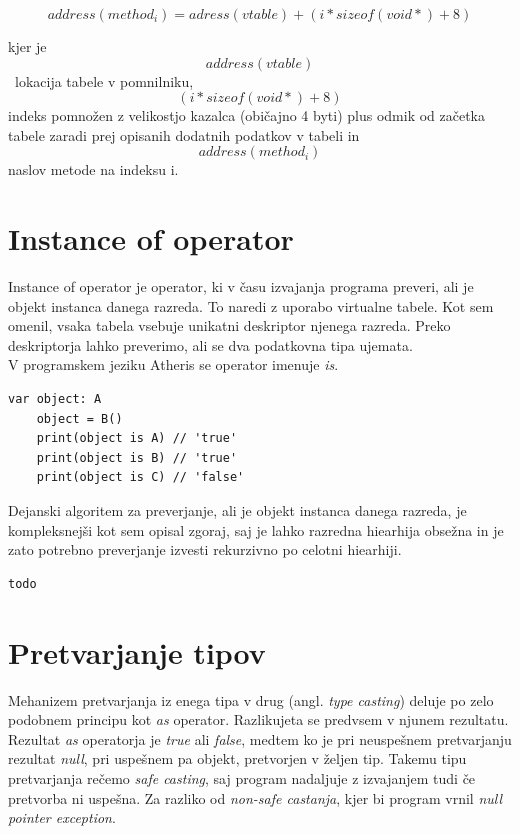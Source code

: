\documentclass[a4paper, 12p]{book}
\begin{document}
\[ address(method_i) = adress(vtable) + (i * sizeof(void*) + 8) \]

kjer je \[address(vtable)\]\ lokacija tabele v pomnilniku, \[(i * sizeof(void*) + 8)\] indeks pomnožen z velikostjo kazalca (običajno 4 byti) plus odmik od začetka tabele zaradi prej opisanih dodatnih podatkov v tabeli in \[ address(method_i)\] naslov metode na indeksu i.

\section{Instance of operator}

Instance of operator je operator, ki v času izvajanja programa preveri, ali je objekt instanca danega razreda. To naredi z uporabo virtualne tabele. Kot sem omenil, vsaka tabela vsebuje unikatni deskriptor njenega razreda. Preko deskriptorja lahko preverimo, ali se dva podatkovna tipa ujemata. \\
\indent V programskem jeziku Atheris se operator imenuje \textit{is}.

\begin{lstlisting}[caption={Uporaba operatorja \textit{is} za razrede iz sheme ~\ref{vtables}}, captionpos=b]
	var object: A
	object = B()
	print(object is A) // 'true'
	print(object is B) // 'true'
	print(object is C) // 'false'
\end{lstlisting}

Dejanski algoritem za preverjanje, ali je objekt instanca danega razreda, je  kompleksnejši kot sem opisal zgoraj, saj je lahko razredna hiearhija obsežna in je zato potrebno preverjanje izvesti rekurzivno po celotni hiearhiji.

\begin{lstlisting}[caption={Algoritem za izračun ali je objekt instanca danega razeda}, captionpos=b]
todo
\end{lstlisting}

\section{Pretvarjanje tipov}

Mehanizem pretvarjanja iz enega tipa v drug (angl. \textit{type casting}) deluje po zelo podobnem principu kot \textit{as} operator. Razlikujeta se predvsem v njunem rezultatu. Rezultat \textit{as} operatorja je \textit{true} ali \textit{false}, medtem ko je pri neuspešnem pretvarjanju rezultat \textit{null}, pri uspešnem pa objekt, pretvorjen v željen tip. Takemu tipu pretvarjanja rečemo \textit{safe casting}, saj program nadaljuje z izvajanjem tudi če pretvorba ni uspešna. Za razliko od \textit{non-safe castanja}, kjer bi program vrnil \textit{null pointer exception}.
\end{document}
